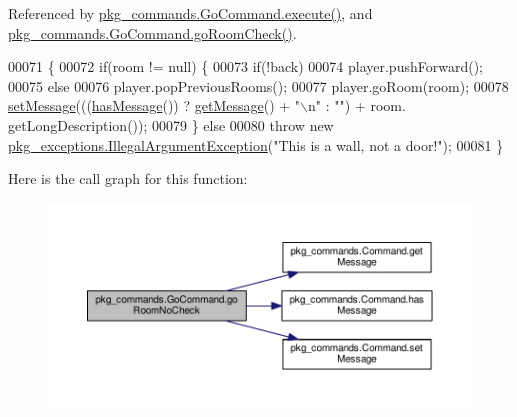 Referenced by \hyperlink{GoCommand_8java_source_l00032}{pkg\-\_\-commands.\-Go\-Command.\-execute()}, and \hyperlink{GoCommand_8java_source_l00056}{pkg\-\_\-commands.\-Go\-Command.\-go\-Room\-Check()}.


\begin{DoxyCode}
00071                                                                                                            
                   \{
00072         \textcolor{keywordflow}{if}(room != null) \{
00073             \textcolor{keywordflow}{if}(!back)
00074                 player.pushForward();
00075             \textcolor{keywordflow}{else}
00076                 player.popPreviousRooms();
00077             player.goRoom(room);
00078             \hyperlink{classpkg__commands_1_1Command_ae210ff216fe908b111ba1c988a963d13}{setMessage}(((\hyperlink{classpkg__commands_1_1Command_ae46bb048d0fa705a5037a5204b530da2}{hasMessage}()) ? \hyperlink{classpkg__commands_1_1Command_ac2a42e2bab264821892daefaf9a18b6c}{getMessage}() + \textcolor{stringliteral}{"\(\backslash\)n"} : \textcolor{stringliteral}{""}) + room.
      getLongDescription());
00079         \} \textcolor{keywordflow}{else}
00080             \textcolor{keywordflow}{throw} \textcolor{keyword}{new} \hyperlink{classpkg__exceptions_1_1IllegalArgumentException}{pkg\_exceptions.IllegalArgumentException}(\textcolor{stringliteral}{"This
       is a wall, not a door!"});
00081     \}
\end{DoxyCode}


Here is the call graph for this function\-:
\nopagebreak
\begin{figure}[H]
\begin{center}
\leavevmode
\includegraphics[width=350pt]{classpkg__commands_1_1GoCommand_a210afbc5f3ef34d3ad5759d853c8f8c2_cgraph}
\end{center}
\end{figure}




